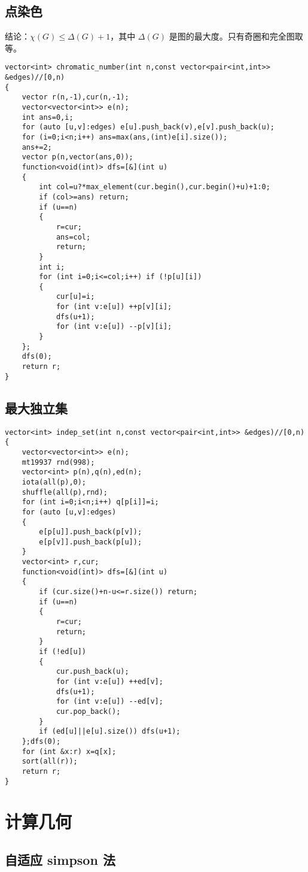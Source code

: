 \documentclass{ctexart}
\begin{document}
\subsection{点染色}

结论：$\chi(G)\le \Delta(G)+1$，其中 $\Delta(G)$ 是图的最大度。只有奇圈和完全图取等。

\begin{lstlisting}
vector<int> chromatic_number(int n,const vector<pair<int,int>> &edges)//[0,n)
{
	vector r(n,-1),cur(n,-1);
	vector<vector<int>> e(n);
	int ans=0,i;
	for (auto [u,v]:edges) e[u].push_back(v),e[v].push_back(u);
	for (i=0;i<n;i++) ans=max(ans,(int)e[i].size());
	ans+=2;
	vector p(n,vector(ans,0));
	function<void(int)> dfs=[&](int u)
	{
		int col=u?*max_element(cur.begin(),cur.begin()+u)+1:0;
		if (col>=ans) return;
		if (u==n)
		{
			r=cur;
			ans=col;
			return;
		}
		int i;
		for (int i=0;i<=col;i++) if (!p[u][i])
		{
			cur[u]=i;
			for (int v:e[u]) ++p[v][i];
			dfs(u+1);
			for (int v:e[u]) --p[v][i];
		}
	};
	dfs(0);
	return r;
}
\end{lstlisting}

\subsection{最大独立集}

\begin{lstlisting}
vector<int> indep_set(int n,const vector<pair<int,int>> &edges)//[0,n)
{
	vector<vector<int>> e(n);
	mt19937 rnd(998);
	vector<int> p(n),q(n),ed(n);
	iota(all(p),0);
	shuffle(all(p),rnd);
	for (int i=0;i<n;i++) q[p[i]]=i;
	for (auto [u,v]:edges)
	{
		e[p[u]].push_back(p[v]);
		e[p[v]].push_back(p[u]);
	}
	vector<int> r,cur;
	function<void(int)> dfs=[&](int u)
	{
		if (cur.size()+n-u<=r.size()) return;
		if (u==n)
		{
			r=cur;
			return;
		}
		if (!ed[u])
		{
			cur.push_back(u);
			for (int v:e[u]) ++ed[v];
			dfs(u+1);
			for (int v:e[u]) --ed[v];
			cur.pop_back();
		}
		if (ed[u]||e[u].size()) dfs(u+1);
	};dfs(0);
	for (int &x:r) x=q[x];
	sort(all(r));
	return r;
}
\end{lstlisting}




\newpage

\section{计算几何}

\subsection{自适应 simpson 法}
\end{document}
